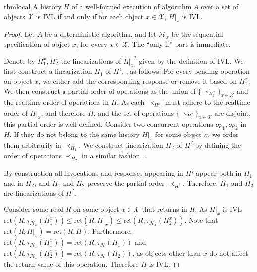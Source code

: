\begin{restatable}{thm}{local}
  \label{ivl-thm:ivl-local}
  A history $H$ of a well-formed execution of algorithm $A$ over a set of objects $\mathcal{X}$
  is IVL if and only if for each object $x \in \mathcal{X}$, $H|_x$ is IVL.
\end{restatable}
\begin{proof}
  Let $A$ be a deterministic algorithm, and let $\mathcal{H}_x$ be the sequential specification of object $x$, for every $x \in \mathcal{X}$.
  The ``only if'' part is immediate.

  Denote by ${H_1^x}, {H_2^x}$ the linearizations of ${H|_x}^?$ given by the
  definition of IVL.
  We first construct a linearization $H_1$ of $H^?$, ,
  as follows: For every pending operation on object $x$, we either
  add the corresponding response or remove it based on ${H_1^x}$. We then construct a partial order
  of operations as the union of $\{{\prec}_{H_1^x}\}_{x \in \mathcal{X}}$ and the realtime order
  of operations in $H$. As each ${\prec}_{H_1^x}$ must adhere to the realtime order of $H|_x$,
  and therefore $H$, and the set of operations $\{{\prec}_{H_1^x}\}_{x \in \mathcal{X}}$ are disjoint, this partial order
  is well defined. Consider two concurrent operations $op_1, op_2$ in $H$. If they
  do not belong to the same history $H|_x$ for some object $x$, we order them arbitrarily in $\prec_{H_1}$.
  We construct linearization $H_2$ of $H^2$ by defining the order of operations $\prec_{H_2}$ in a similar fashion,
  .

  By construction all invocations and responses appearing in $H^?$ appear both in $H_1$ and in $H_2$,
  and $H_1$ and $H_2$ preserve the partial order $\prec_{H^?}$. Therefore, $H_1$ and $H_2$ are linearizations
  of $H^?$.
  
  Consider some read $R$ on some object $x \in \mathcal{X}$ that returns in $H$. As $H|_x$ is IVL
  $\text{ret}(R,  \tau_{\mathcal{H}_x}(H_1^x)) \leq \text{ret}(R, H|_x) \leq \text{ret}(R, \tau_{\mathcal{H}_x}(H_2^x))$.
  Note that $\text{ret}(R, H|_x) = \text{ret}(R, H)$.
  Furthermore, $\text{ret}(R, \tau_{\mathcal{H}_x}(H_1^x))= \text{ret}(R, \tau_{\mathcal{H}}(H_1))$
  and $\text{ret}(R, \tau_{\mathcal{H}_x}(H_2^x))= \text{ret}(R, \tau_{\mathcal{H}}(H_2))$,
  as objects other than $x$ do not affect the return value of this operation. Therefore $H$ is IVL.
\end{proof}
